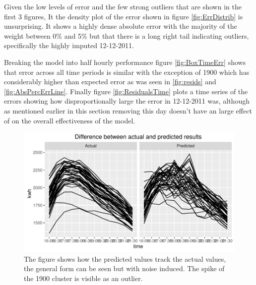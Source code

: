 Given the low levels of error and the few strong outliers that are shown in the first 3 figures, It the density plot of the error shown in figure \ref{fig:ErrDistrib} is unsurprising. It shows a highly dense absolute error with the majority of the weight between 0\% and 5\% but that there is a long right tail indicating outliers, specifically the highly imputed 12-12-2011.

Breaking the model into half hourly performance figure \ref{fig:BoxTimeErr} shows that error across all time periods is similar with the exception of 1900 which has considerably higher than expected error as was seen in \ref{fig:resids} and \ref{fig:AbsPercErrLine}. Finally figure \ref{fig:ResidualsTime} plots a time series of the errors showing how disproportionally large the error in 12-12-2011 was, although as mentioned earlier in this section removing this day doesn't have an large effect of on the overall effectiveness of the model.

\begin{figure}
    \centering
    \includegraphics[width=\textwidth]{Figures/Results/ActualVsPredLine}
    \caption[Comparing actual vs predicted results]{The figure shows how the predicted values track the actual values, the general form can be seen but with noise induced. The spike of the 1900 cluster is visible as an outlier.}
    \label{fig:ActualVsPredLine}
\end{figure}



